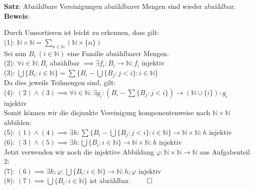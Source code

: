 \documentclass[12pt,german,a4]{article}
\begin{document}
{\bf Satz}: Abzählbare Vereinigungen abzählbarer Mengen sind wieder abzählbar.\\

{\bf Beweis}:

Durch Umsortieren ist leicht zu erkennen, dass gilt:\\

(1): $\mathbb{N} \times \mathbb{N} = \sum_{n \in \mathbb{N}}{(\mathbb{N} \times \{n\})}$ \\

Sei nun $B_{i}~ (i \in \mathbb{N})$ eine Familie abzählbarer Mengen.\\

(2): $\forall i \in \mathbb{N}: B_{i}$ abzählbar $\implies \exists f_{i} : B_{i} \rightarrow \mathbb{N}: f_{i}$ injektiv\\

(3): $\bigcup\{B_{i} : i \in \mathbb{N}\} = \sum\{B_{i} - \bigcup\{B_{j} : j < i\} : i \in \mathbb{N}\}$\\

Da dies jeweils Teilmengen sind, gilt:\\

(4): $(2) \wedge (3) \implies \forall i \in \mathbb{N}: \exists g_{i} :( B_{i} - \sum\{B_{j}: j < i\}) \rightarrow (\mathbb{N} \cup \{i\}): g_{i}$ injektiv\\

Somit können wir die disjunkte Vereinigung komponentenweise nach $\mathbb{N} \times \mathbb{N}$ abbilden:\\

(5): $(1) \wedge (4) \implies \exists h:  \sum\{B_{i} - \bigcup\{B_{j} : j < i\} : i \in \mathbb{N}\} \rightarrow \mathbb{N} \times \mathbb{N}: h$ injektiv\\

(6): $(3) \wedge (5) \implies \exists h: \bigcup\{B_{i} : i \in \mathbb{N}\} \rightarrow \mathbb{N} \times \mathbb{N}: h$ injektiv\\

Jetzt verwenden wir noch die injektive Abbildung $\varphi : \mathbb{N} \times \mathbb{N} \rightarrow \mathbb{N}$ aus Aufgabenteil 2:\\

(7): $(6) \implies \exists h;\varphi : \bigcup\{B_{i} : i \in \mathbb{N}\} \rightarrow \mathbb{N}: h;\varphi$ injektiv\\

(8): $(7) \implies \bigcup\{B_{i} : i \in \mathbb{N}\}$ ist abzählbar. $\qed$
\end{document}
